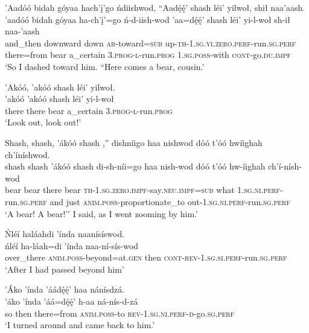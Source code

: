 \ea\label{ex:text6-3-13}
’Aadóó bidah góyaa hach’į’go ńdiishwod, ``Aadę́ę́’ shash léi’ yilwoł, shił naa’aash.\\
\gll ’aadóó	bidah	góyaa	ha-ch’į’=go	ń-d-iish-wod	’aa=dę́ę́’	shash	léi’	yi-l-woł	sh-ił	naa-’aash\\
     and\_then	downward	down	\textsc{ar}-toward=\textsc{sub}	up-\textsc{th}-1.\textsc{sg}.\textsc{yi}.\textsc{zero}.\textsc{perf}-run.\textsc{sg}.\textsc{perf}	there=from	bear	a\_certain	3.\textsc{prog}-\textsc{l}-run.\textsc{prog}	1.\textsc{sg}.\textsc{poss}-with	\textsc{cont}-go.\textsc{du}.\textsc{impf}\\
\glt `So I dashed toward him. ``Here comes a bear, cousin.'
\z

\ea\label{ex:text6-3-14}
’Akóó, ’akóó shash léi’ yilwoł.\\
\gll ’akóó	’akóó	shash	léi’	yi-l-woł\\
     there	there	bear	a\_certain	3.\textsc{prog}-\textsc{l}-run.\textsc{prog}\\
\glt `Look out, look out!'
\z

\ea\label{ex:text6-3-15}
Shash, shash, ’ákóó shash ,'' dishníigo haa nishwod dóó t’óó hwíighah ch’íníshwod.\\
\gll shash	shash	’ákóó	shash	di-sh-níi=go	haa	nish-wod	dóó	t’óó	hw-íighah	ch’í-nísh-wod\\
     bear	bear	there	bear	\textsc{th}-1.\textsc{sg}.\textsc{zero}.\textsc{impf}-say.\textsc{neu}.\textsc{impf}=\textsc{sub}	what	1.\textsc{sg}.\textsc{ni}.\textsc{perf}-run.\textsc{sg}.\textsc{perf}	and	just	\textsc{anim}.\textsc{poss}-proportionate\_to	out-1.\textsc{sg}.\textsc{ni}.\textsc{perf}-run.\textsc{sg}.\textsc{perf}\\
\glt `A bear! A bear!'' I said, as I went zooming by him.'
\z

\ea\label{ex:text6-3-16}
Ńléí haláahdi ’índa naanísíswod.\\
\gll ńléí	ha-láah=di	’índa	naa-ní-sís-wod\\
     over\_there	\textsc{anim}.\textsc{poss}-beyond=at.\textsc{gen}	then	\textsc{cont}-\textsc{rev}-1.\textsc{sg}.\textsc{si}.\textsc{perf}-run.\textsc{sg}.\textsc{perf}\\
\glt `After I had passed beyond him'
\z

\ea\label{ex:text6-3-17}
’Áko ’índa ’áádę́ę́’ haa nánísdzá.\\
\gll ’áko	’índa	’áá=dę́ę́’	h-aa	ná-nís-d-zá\\
     so	then	there=from	\textsc{anim}.\textsc{poss}-to	\textsc{rev}-1.\textsc{sg}.\textsc{ni}.\textsc{perf}-\textsc{d}-go.\textsc{sg}.\textsc{perf}\\
\glt `I turned around and came back to him.'
\z

